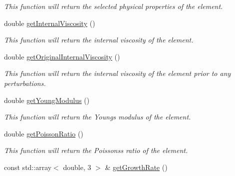 \begin{DoxyCompactItemize}
\begin{DoxyCompactList}\small\item\em This function will return the selected physical properties of the element. \end{DoxyCompactList}\item 
\hypertarget{classShapeBase_a51bc2c7303dfaae0687d1d785b077e81}{}double \hyperlink{classShapeBase_a51bc2c7303dfaae0687d1d785b077e81}{get\+Internal\+Viscosity} ()\label{classShapeBase_a51bc2c7303dfaae0687d1d785b077e81}

\begin{DoxyCompactList}\small\item\em This function will return the internal viscosity of the element. \end{DoxyCompactList}\item 
\hypertarget{classShapeBase_ac0651f685642cfddf6cefa3542ece51a}{}double \hyperlink{classShapeBase_ac0651f685642cfddf6cefa3542ece51a}{get\+Original\+Internal\+Viscosity} ()\label{classShapeBase_ac0651f685642cfddf6cefa3542ece51a}

\begin{DoxyCompactList}\small\item\em This function will return the internal viscosity of the element prior to any perturbations. \end{DoxyCompactList}\item 
\hypertarget{classShapeBase_ade96ff86461eaabce716e83fa68bfa19}{}double \hyperlink{classShapeBase_ade96ff86461eaabce716e83fa68bfa19}{get\+Young\+Modulus} ()\label{classShapeBase_ade96ff86461eaabce716e83fa68bfa19}

\begin{DoxyCompactList}\small\item\em This function will return the Young\textquotesingle{}s modulus of the element. \end{DoxyCompactList}\item 
\hypertarget{classShapeBase_a01140f17779cd2e990c9f28e3c86b77e}{}double \hyperlink{classShapeBase_a01140f17779cd2e990c9f28e3c86b77e}{get\+Poisson\+Ratio} ()\label{classShapeBase_a01140f17779cd2e990c9f28e3c86b77e}

\begin{DoxyCompactList}\small\item\em This function will return the Poissons\textquotesingle{}s ratio of the element. \end{DoxyCompactList}\item 
\hypertarget{classShapeBase_a348086a2524d9f12ca7748757d6ce645}{}const std\+::array$<$ double, 3 $>$ \& \hyperlink{classShapeBase_a348086a2524d9f12ca7748757d6ce645}{get\+Growth\+Rate} ()\label{classShapeBase_a348086a2524d9f12ca7748757d6ce645}


\end{DoxyCompactItemize}
